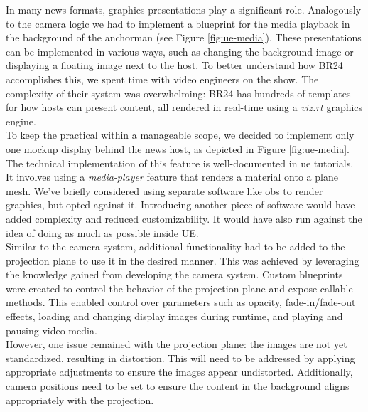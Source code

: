 \documentclass[
  a4paper,  %
  twoside,  %
  bibliography=totoc,
  headsepline,
  cleardoublepage=empty,
  parskip=half,
  draft=false
]{scrbook}
\begin{document}
In many news formats, graphics presentations play a significant role. Analogously to the camera logic we had to implement a blueprint for the media playback in the background of the anchorman (see Figure \ref{fig:ue-media}). These presentations can be implemented in various ways, such as changing the background image or displaying a floating image next to the host. To better understand how BR24 accomplishes this, we spent time with video engineers on the show. The complexity of their system was overwhelming: BR24 has hundreds of templates for how hosts can present content, all rendered in real-time using a \textit{viz.rt} graphics engine. \\
To keep the practical within a manageable scope, we decided to implement only one mockup display behind the news host, as depicted in Figure \ref{fig:ue-media}. The technical implementation of this feature is well-documented in \gls{ue} tutorials. It involves using a \textit{media-player} feature that renders a material onto a plane mesh.
We've briefly considered using separate software like \gls{obs} to render graphics, but opted against it. Introducing another piece of software would have added complexity and reduced customizability. It would have also run against the idea of doing as much as possible inside UE. \\
Similar to the camera system, additional functionality had to be added to the projection plane to use it in the desired manner. This was achieved by leveraging the knowledge gained from developing the camera system. Custom blueprints were created to control the behavior of the projection plane and expose callable methods. This enabled control over parameters such as opacity, fade-in/fade-out effects, loading and changing display images during runtime, and playing and pausing video media. \\
However, one issue remained with the projection plane: the images are not yet standardized, resulting in distortion. This will need to be addressed by applying appropriate adjustments to ensure the images appear undistorted. Additionally, camera positions need to be set to ensure the content in the background aligns appropriately with the projection.
\end{document}
